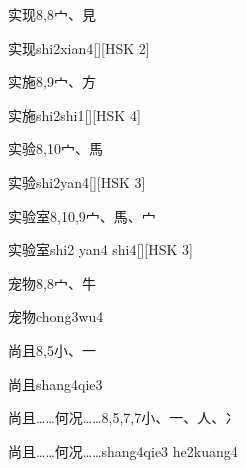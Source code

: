 \begin{entry}{实现}{8,8}{⼧、⾒}
  \begin{phonetics}{实现}{shi2xian4}[][HSK 2]
  \end{phonetics}
\end{entry}

\begin{entry}{实施}{8,9}{⼧、⽅}
  \begin{phonetics}{实施}{shi2shi1}[][HSK 4]
  \end{phonetics}
\end{entry}

\begin{entry}{实验}{8,10}{⼧、⾺}
  \begin{phonetics}{实验}{shi2yan4}[][HSK 3]
  \end{phonetics}
\end{entry}

\begin{entry}{实验室}{8,10,9}{⼧、⾺、⼧}
  \begin{phonetics}{实验室}{shi2 yan4 shi4}[][HSK 3]
  \end{phonetics}
\end{entry}

\begin{entry}{宠物}{8,8}{⼧、⽜}
  \begin{phonetics}{宠物}{chong3wu4}
  \end{phonetics}
\end{entry}

\begin{entry}{尚且}{8,5}{⼩、⼀}
  \begin{phonetics}{尚且}{shang4qie3}
  \end{phonetics}
\end{entry}

\begin{entry}{尚且……何况……}{8,5,7,7}{⼩、⼀、⼈、⼎}
  \begin{phonetics}{尚且……何况……}{shang4qie3 he2kuang4}
  \end{phonetics}
\end{entry}

